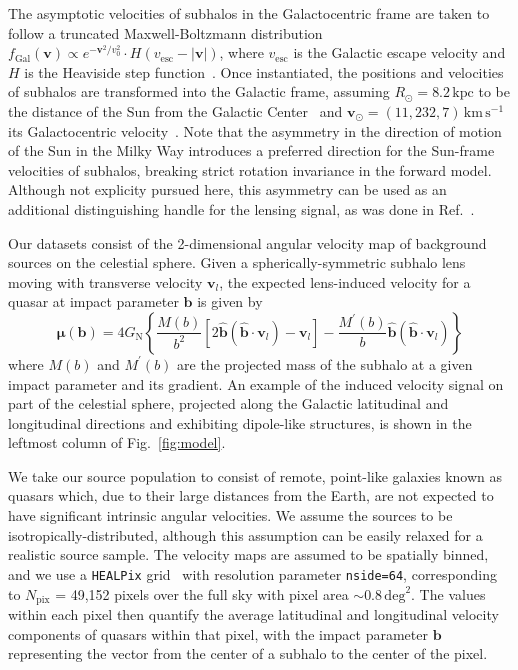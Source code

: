 \documentclass[preprint]{article}
\begin{document}
The asymptotic velocities of subhalos in the Galactocentric frame are taken to follow a truncated Maxwell-Boltzmann distribution $f_{\mathrm{Gal}}(\mathbf{v})\propto e^{-\mathbf{v}^{2} / v_{0}^{2}}\cdot H(v_\mathrm{esc} - |\mathbf{v}|)$, where $v_\mathrm{esc}$ is the Galactic escape velocity and $H$ is the Heaviside step function~\cite{1939isss.book.....C,Lisanti:2016jxe}. Once instantiated, the positions and velocities of subhalos are transformed into the Galactic frame, assuming $R_\odot = 8.2\,\mathrm{kpc}$ to be the distance of the Sun from the Galactic Center~\cite{2019A&A...625L..10G,2020arXiv201202169B} and $\mathbf{v}_{\odot} = (11, 232, 7)\,\mathrm{km}\,\mathrm{s}^{-1}$ its Galactocentric velocity~\cite{2010MNRAS.403.1829S}. Note that the asymmetry in the direction of motion of the Sun in the Milky Way introduces a preferred direction for the Sun-frame velocities of subhalos, breaking strict rotation invariance in the forward model. Although not explicity pursued here, this asymmetry can be used as an additional distinguishing handle for the lensing signal, as was done in Ref.~\cite{Mishra-Sharma:2020ynk}.

Our datasets consist of the 2-dimensional angular velocity map of background sources on the celestial sphere. 
Given a spherically-symmetric subhalo lens moving with transverse velocity $\mathbf{v}_{l}$, the expected lens-induced velocity for a quasar at impact parameter $\mathbf{b}$ is given by~\cite{VanTilburg:2018ykj}
\begin{equation}
\boldsymbol{\mu}(\mathbf{b})=4 G_{\mathrm{N}}\left\{\frac{M(b)}{b^{2}}\left[2 \hat{\mathbf{b}}\left(\hat{\mathbf{b}} \cdot \mathbf{v}_{l}\right)-\mathbf{v}_{l}\right]-\frac{M^{\prime}(b)}{b} \hat{\mathbf{b}}\left(\hat{\mathbf{b}} \cdot \mathbf{v}_{l}\right)\right\}
\end{equation}
where $M(b)$ and $M^{\prime}(b)$ are the projected mass of the subhalo at a given impact parameter and its gradient. An example of the induced velocity signal on part of the celestial sphere, projected along the Galactic latitudinal and longitudinal directions and exhibiting dipole-like structures, is shown in the leftmost column of Fig.~\ref{fig:model}.

We take our source population to consist of remote, point-like galaxies known as quasars which, due to their large distances from the Earth, are not expected to have significant intrinsic angular velocities. We assume the sources to be isotropically-distributed, although this assumption can be easily relaxed for a realistic source sample. The velocity maps are assumed to be spatially binned, and we use  a \texttt{HEALPix} grid~\cite{Gorski:2004by} with resolution parameter \texttt{nside=64}, corresponding to $N_\mathrm{pix}$ = 49,152 pixels over the full sky with pixel area $\sim 0.8\,\mathrm{deg}^2$. The values within each pixel then quantify the average latitudinal and longitudinal velocity components of quasars within that pixel, with the impact parameter $\mathbf b$ representing the vector from the center of a subhalo to the center of the pixel.
\end{document}
